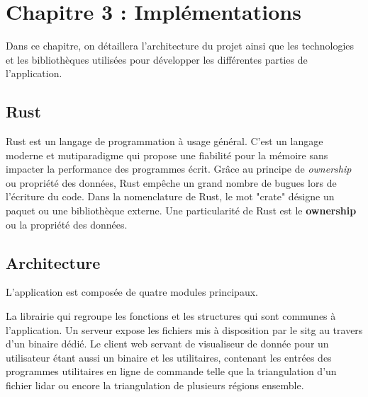 \chapter{Chapitre 3 : Implémentations}

Dans ce chapitre, on détaillera l'architecture du projet 
ainsi que les technologies et les bibliothèques utilisées
pour développer les différentes parties de l'application.


\section{Rust}

Rust est un langage de programmation à usage général. C'est un langage moderne
et mutiparadigme qui propose une fiabilité pour la mémoire sans impacter la
performance des programmes écrit.
Grâce au principe de \textit{ownership} ou propriété des données, Rust empêche un grand nombre de
bugues lors de l'écriture du code. 
Dans la nomenclature de Rust, le mot "crate" désigne un paquet ou une bibliothèque
externe.
Une particularité de Rust est le \textbf{ownership} ou la propriété des données.


\section{Architecture}

L'application est composée de quatre modules principaux.

La librairie qui regroupe les fonctions et les structures qui sont communes à l'application.
Un serveur expose les fichiers mis à disposition par le \gls{sitg} au travers d'un binaire dédié.
Le client web servant de visualiseur de donnée pour un utilisateur étant aussi un binaire et
les utilitaires, contenant les entrées des programmes utilitaires en ligne de commande telle que la triangulation d'un fichier lidar ou encore la triangulation de plusieurs régions ensemble.


